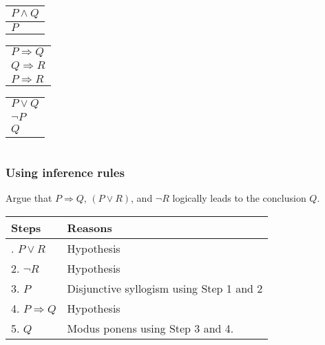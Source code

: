 \begin{frame}
\begin{columns}
    \begin{column}{0.5\textwidth}

      \begin{tcolorbox}[title=Simplification]
        \begin{tabular}{l}
          $P\wedge Q$\\
          \hline
          $P$
        \end{tabular}
      \end{tcolorbox}
      
      \begin{tcolorbox}[title=Hypothetical syllogism]
        \begin{tabular}{l}
          $P\Rightarrow Q$\\
          $Q\Rightarrow R$\\
          \hline
          $P\Rightarrow R$
        \end{tabular}
      \end{tcolorbox}
      
      \begin{tcolorbox}[title=Disjunctive syllogism]
        \begin{tabular}{l}
          $P\vee Q$\\
          $\neg P$\\
          \hline
          $Q$
        \end{tabular}
      \end{tcolorbox}
      
    \end{column}
    
  \end{columns}
\end{frame}

\begin{frame}\frametitle{Using inference rules}
  \begin{tcolorbox}
    Argue that $P\Rightarrow Q$, $(P\vee R)$, and $\neg R$ logically
    leads to the conclusion $Q$.
  \end{tcolorbox}
  \pause
  \begin{tabular}{ll}
    {\bf Steps} & {\bf Reasons}\\
    \hline\pause
    1. $P\vee R$ & Hypothesis\pause \\
    2. $\neg R$ & Hypothesis\pause \\
    3. $P$ & Disjunctive syllogism using Step 1 and 2\pause \\
    4. $P\Rightarrow Q$ & Hypothesis\pause \\
    5. $Q$ & Modus ponens using Step 3 and 4.
  \end{tabular}
\end{frame}

